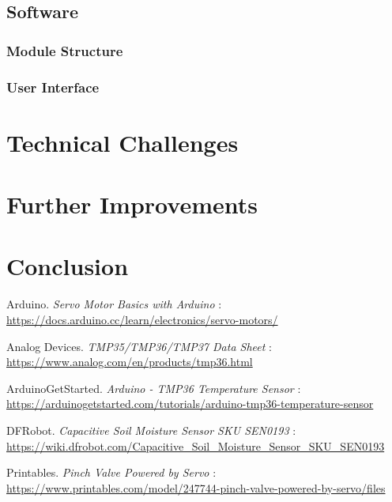 \documentclass[a4paper,11pt]{article}
\begin{document}
\subsection{Software}
\label{sec:software}

\subsubsection{Module Structure}
\label{subsec:software_modules}

\subsubsection{User Interface}
\label{subsec:software_ui}

\section{Technical Challenges}
\label{sec:technical_problems}

\section{Further Improvements}
\label{sec:further_improvements}

\section{Conclusion}
\label{sec:conclusion}

\begin{thebibliography}{9}

Arduino. \textit{Servo Motor Basics with Arduino} : \\
\url{https://docs.arduino.cc/learn/electronics/servo-motors/}

Analog Devices. \textit{TMP35/TMP36/TMP37 Data Sheet} : \\
\url{https://www.analog.com/en/products/tmp36.html} 

ArduinoGetStarted. \textit{Arduino - TMP36 Temperature Sensor} : \\
\url{https://arduinogetstarted.com/tutorials/arduino-tmp36-temperature-sensor}

DFRobot. \textit{Capacitive Soil Moisture Sensor SKU SEN0193} : \\
\url{https://wiki.dfrobot.com/Capacitive_Soil_Moisture_Sensor_SKU_SEN0193}

Printables. \textit{Pinch Valve Powered by Servo} : \\
\url{https://www.printables.com/model/247744-pinch-valve-powered-by-servo/files}

\end{thebibliography}
\end{document}
